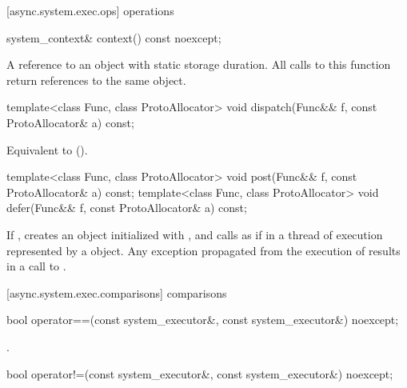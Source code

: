[async.system.exec.ops]{ operations}

\begin{itemdecl}
system_context& context() const noexcept;
\end{itemdecl}

\begin{itemdescr}
\pnum
\returns A reference to an object with static storage duration. All calls to this function return references to the same object.
\end{itemdescr}

\begin{itemdecl}
template<class Func, class ProtoAllocator>
  void dispatch(Func&& f, const ProtoAllocator& a) const;
\end{itemdecl}

\begin{itemdescr}
\pnum
\effects Equivalent to  ().
\end{itemdescr}

\begin{itemdecl}
template<class Func, class ProtoAllocator>
  void post(Func&& f, const ProtoAllocator& a) const;
template<class Func, class ProtoAllocator>
  void defer(Func&& f, const ProtoAllocator& a) const;
\end{itemdecl}

\begin{itemdescr}
\pnum
\effects If , creates an object  initialized with , and calls  as if in a thread of execution represented by a  object. Any exception propagated from the execution of  results in a call to .
\end{itemdescr}



[async.system.exec.comparisons]{ comparisons}

\begin{itemdecl}
bool operator==(const system_executor&, const system_executor&) noexcept;
\end{itemdecl}

\begin{itemdescr}
\pnum
\returns {}.
\end{itemdescr}

\begin{itemdecl}
bool operator!=(const system_executor&, const system_executor&) noexcept;
\end{itemdecl}

